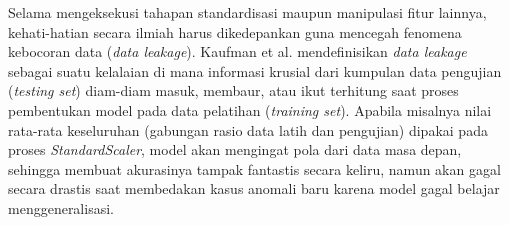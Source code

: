 Selama mengeksekusi tahapan standardisasi maupun manipulasi fitur lainnya, kehati-hatian secara ilmiah harus dikedepankan guna mencegah fenomena kebocoran data (\textit{data leakage}). Kaufman et al.  \cite{kaufman2011leakage} mendefinisikan \textit{data leakage} sebagai suatu kelalaian di mana informasi krusial dari kumpulan data pengujian (\textit{testing set}) diam-diam masuk, membaur, atau ikut terhitung saat proses pembentukan model pada data pelatihan (\textit{training set}). Apabila misalnya nilai rata-rata keseluruhan (gabungan rasio data latih dan pengujian) dipakai pada proses \textit{StandardScaler}, model akan mengingat pola dari data masa depan, sehingga membuat akurasinya tampak fantastis secara keliru, namun akan gagal secara drastis saat membedakan kasus anomali baru karena model gagal belajar menggeneralisasi. 



        




